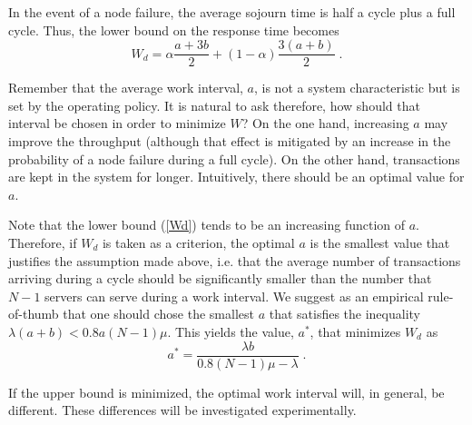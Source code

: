 In the event of a node failure, the average sojourn time is half a cycle plus a
full cycle. Thus, the lower bound on the response time becomes
\begin{equation} \label{Wd}
W_d = \alpha \frac{a+3b}{2} + (1-\alpha)\frac{3(a+b)}{2}\;.
\end{equation}

Remember that the average work interval, $a$, is not a system characteristic
but is set by the operating policy. It is natural to ask therefore, how should that
interval be chosen in order to minimize $W$? On the one hand, increasing $a$
may improve the throughput (although that effect is mitigated by an increase in
the probability of a node failure during a full cycle). On the other hand, transactions
are kept in the system for longer. Intuitively, there should be an optimal
value for $a$.

Note that the lower bound (\ref{Wd}) tends to be an increasing function of $a$.
Therefore, if $W_d $ is taken as a criterion, the optimal $a$ is the smallest value that
justifies the assumption made above, i.e. that the average number of transactions arriving
during a cycle should be significantly smaller
than the number that $N-1$ servers can serve during a work interval. We suggest
as an empirical rule-of-thumb that one should chose the smallest $a$ that satisfies
the inequality $\lambda (a+b)< 0.8 a (N-1)\mu$. This yields the value, $a^*$, that
minimizes $W_d $ as
\begin{equation} \label{aa}
a^* = \frac{\lambda b}{0.8(N-1)\mu-\lambda}\;.
\end{equation}

If the upper bound is minimized, the optimal work interval will, in general, be different.
These differences will be investigated  experimentally.






